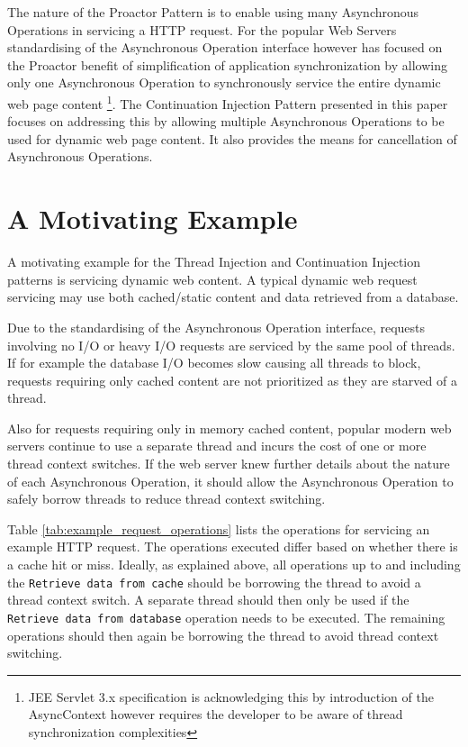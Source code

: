 \documentclass{article}
\begin{document}
The nature of the Proactor Pattern is to enable using many Asynchronous
Operations in servicing a HTTP request.  For the popular Web Servers
standardising of the Asynchronous Operation interface however has focused on the
Proactor benefit of simplification of application synchronization by allowing
only one Asynchronous Operation to synchronously service the entire dynamic web
page content \footnote{JEE Servlet 3.x specification is acknowledging this by
introduction of the AsyncContext however requires the developer to be aware of
thread synchronization complexities}.  The Continuation Injection Pattern
presented in this paper focuses on addressing this by allowing multiple
Asynchronous Operations to be used for dynamic web page content. It also
provides the means for cancellation of Asynchronous Operations.

\section{A Motivating Example}

A motivating example for the Thread Injection and Continuation Injection
patterns is servicing dynamic web content.  A typical dynamic web request
servicing may use both cached/static content and data retrieved from a database.

Due to the standardising of the Asynchronous Operation interface, requests
involving no I/O or heavy I/O requests are serviced by the same pool of threads.
If for example the database I/O becomes slow causing all threads to block,
requests requiring only cached content are not prioritized as they are starved
of a thread.

Also for requests requiring only in memory cached content, popular modern web
servers continue to use a separate thread and incurs the cost of one or more
thread context switches.  If the web server knew further details about the
nature of each Asynchronous Operation, it should allow the Asynchronous
Operation to safely borrow threads to reduce thread context switching.

Table \ref{tab:example_request_operations} lists the operations for servicing an
example HTTP request.  The operations executed differ based on whether there is
a cache hit or miss.  Ideally, as explained above, all operations up to and
including the \texttt{Retrieve data from cache} should be borrowing the thread
to avoid a thread context switch.  A separate thread should then only be used if
the \texttt{Retrieve data from database} operation needs to be executed.  The
remaining operations should then again be borrowing the thread to avoid thread
context switching.
\end{document}
